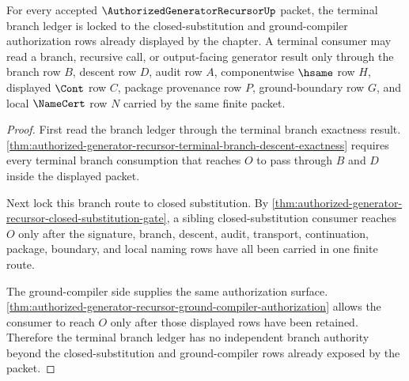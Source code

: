 \begin{theorem}
\label{thm:authorized-generator-recursor-terminal-branch-ledger-lock}
For every accepted $\AuthorizedGeneratorRecursorUp$ packet, the terminal branch ledger is locked to the closed-substitution and ground-compiler authorization rows already displayed by the chapter. A terminal consumer may read a branch, recursive call, or output-facing generator result only through the branch row $B$, descent row $D$, audit row $A$, componentwise $\hsame$ row $H$, displayed $\Cont$ row $C$, package provenance row $P$, ground-boundary row $G$, and local $\NameCert$ row $N$ carried by the same finite packet.
\end{theorem}
\begin{proof}
First read the branch ledger through the terminal branch exactness result. \autoref{thm:authorized-generator-recursor-terminal-branch-descent-exactness} requires every terminal branch consumption that reaches $O$ to pass through $B$ and $D$ inside the displayed packet.

Next lock this branch route to closed substitution. By \autoref{thm:authorized-generator-recursor-closed-substitution-gate}, a sibling closed-substitution consumer reaches $O$ only after the signature, branch, descent, audit, transport, continuation, package, boundary, and local naming rows have all been carried in one finite route.

The ground-compiler side supplies the same authorization surface. \autoref{thm:authorized-generator-recursor-ground-compiler-authorization} allows the consumer to reach $O$ only after those displayed rows have been retained. Therefore the terminal branch ledger has no independent branch authority beyond the closed-substitution and ground-compiler rows already exposed by the packet.
\end{proof}

